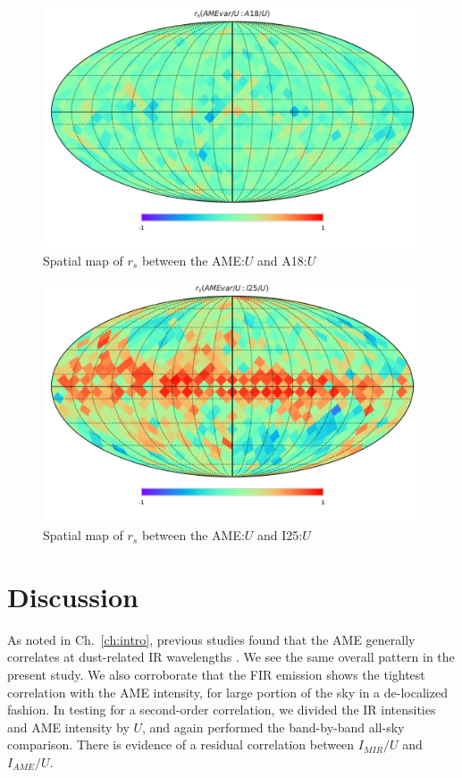      \begin{figure}
       \includegraphics[width=\textwidth/2]{../Plots/Allsky_Corr/RadNorm/Spearman_Map_nside8_AMEvartoA18.pdf}
       \centering
       \caption{Spatial map of $r_{s}$ between the AME:$U$ and A18:$U$}
       \label{fig:Spearman_Map_nside8_AMEvartoIR_RadNorm_A18}
     \end{figure}
   \begin{figure}
        \includegraphics[width=\textwidth/2]{../Plots/Allsky_Corr/UNorm/Spearman_Map_nside8_AMEvartoI25.pdf}
        \centering
        \caption{Spatial map of $r_{s}$ between the AME:$U$ and I25:$U$}
        \label{fig:Spearman_Map_nside8_AMEvartoIR_UNorm_I25}
   \end{figure}

    \section{Discussion}
        As noted in Ch.~\ref{ch:intro}, previous studies found that the AME generally correlates at dust-related IR wavelengths \citep{ysard10b,planckXV, hensley16}. We see the same overall pattern in the present study. We also corroborate that the FIR emission shows the tightest correlation with the AME intensity, for large portion of the sky in a de-localized fashion. In testing for a second-order correlation, we divided the IR intensities and AME intensity by $U$, and again performed the band-by-band all-sky comparison. There is evidence of a residual correlation between $I_{MIR}/U$ and $I_{AME}/U$.

